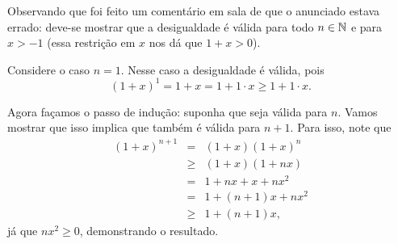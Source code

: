 Observando que foi feito um comentário em sala de que o anunciado estava errado: deve-se mostrar que a desigualdade é válida
para todo $n\in\mathbb{N}$ e para $x>-1$ (essa restrição em $x$ nos dá que $1+x>0$).

Considere o caso $n=1$.
Nesse caso a desigualdade é válida, pois
\[
	(1+x)^1=1+x=1+1\cdot x\geq 1+1\cdot x.
\]

Agora façamos o passo de indução: suponha que seja válida para $n$.
Vamos mostrar que isso implica que também é válida para $n+1$.
Para isso, note que
\begin{eqnarray*}
	(1+x)^{n+1}
	& = & (1+x)(1+x)^n\\
	& \geq & (1+x)(1+nx)\\
	& = & 1+nx+x+nx^2\\
	& = & 1+(n+1)x+nx^2\\
	& \geq & 1+(n+1)x,
\end{eqnarray*}
já que $nx^2\geq 0$, demonstrando o resultado.

